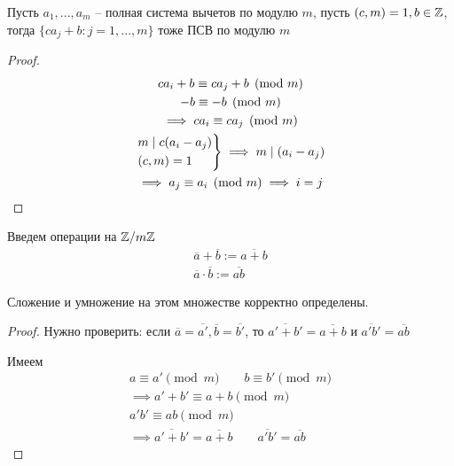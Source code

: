 \documentclass[main]{subfiles}
\begin{document}
\begin{proposition}
    Пусть $a_1, ..., a_m$ -- полная система вычетов по модулю $m$,
    пусть $(c, m) =1, b \in \mathbb{Z}$, тогда $\{ca_j+b: j = 1, ..., m\}$ тоже ПСВ по модулю $m$
\end{proposition}

\begin{proof}
    \begin{gather*}
        ca_i + b  \equiv ca_j + b \pmod{m}\\
        -b \equiv -b \pmod{m}\\
        \implies ca_i \equiv ca_j \pmod{m}\\
        \begin{rcases}
            m \mid c(a_i - a_j) \\
            (c, m) = 1
        \end{rcases} \implies m \mid (a_i-a_j)\\
        \implies a_j \equiv a_i \pmod{m} \implies i = j
    \end{gather*}
\end{proof}

Введем операции на $\mathbb{Z}/m\mathbb{Z}$
\begin{gather*}
    \overline{a}+ \overline{b} := \overline{a+b}\\
    \overline{a}\cdot \overline{b} := \overline{ab}
\end{gather*}


\begin{proposition}
    Сложение и умножение на этом множестве корректно определены.
\end{proposition}
\begin{proof}
    Нужно проверить: если $\overline{a} = \overline{a'}, \overline{b} = \overline{b'}$,
    то $\overline{a'+b'} = \overline{a+b}$ и $\overline{a'b'} =\overline{ab}$

    Имеем
    \begin{gather*}
        a \equiv a' \pmod{m} \qquad b \equiv b' \pmod{m}\\
        \implies a' + b' \equiv a + b \pmod{m} \\
        a'b' \equiv ab \pmod{m}\\
        \implies \overline{a'+b'} = \overline{a+b} \qquad \overline{a'b'} =\overline{ab}
    \end{gather*}
\end{proof}
\end{document}
